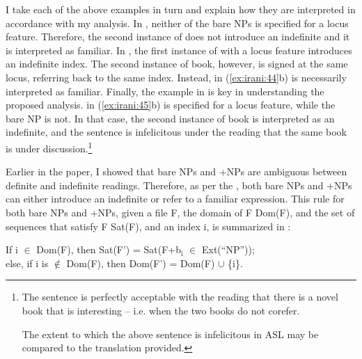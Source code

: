 \documentclass[output=paper,
modfonts
]{langscibook}
\begin{document}
I take each of the above examples in turn and explain how they are interpreted in accordance with my analysis. In , neither of the bare NPs  is specified for a locus feature. Therefore, the second instance of  does not introduce an indefinite and it is interpreted as familiar. In , the first instance of  with a locus feature introduces an indefinite index. The second instance of book, however, is signed at the same locus, referring back to the same index. Instead,  in (\ref{ex:irani:44}b) is necessarily interpreted as familiar. Finally, the example in  is key in understanding the proposed analysis.  in (\ref{ex:irani:45}b) is specified for a locus feature, while the bare NP  is not. In that case, the second instance of book is interpreted as an indefinite, and the sentence is infelicitous under the reading that the same book is under discussion.\footnote{The sentence is perfectly acceptable with the reading that there is a novel book that is interesting -- i.e. when the two books do not corefer.  
	
	\begin{exe} 
	\end{exe} 

The extent to which the above sentence is infelicitous in ASL may be compared to the  translation provided.} 

Earlier in the paper, I showed that bare NPs and +NPs are ambiguous between definite and indefinite readings. Therefore, as per the , both bare NPs and +NPs can either introduce an indefinite or refer to a familiar expression. This rule for both bare NPs and +NPs, given a file F, the domain of F Dom(F), and the set of sequences that satisfy F Sat(F), and an index i, is summarized in : 

\begin{exe}
\ex \label{ex:irani:46} If i \(\in\) Dom(F), then Sat(F') = Sat(F+b$_\text{i}$ \(\in\) Ext(``NP''));\\ else, if i is \(\notin\) Dom(F), then Dom(F') = Dom(F) \(\cup\) \{i\}. \par  
\end{exe}
\end{document}
